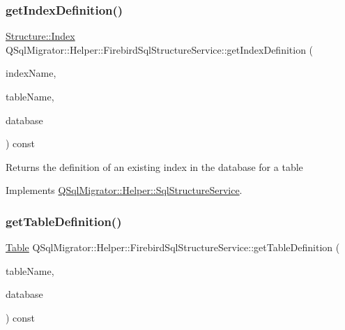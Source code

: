 \subsubsection{\texorpdfstring{get\+Index\+Definition()}{getIndexDefinition()}}
{\footnotesize\ttfamily \hyperlink{class_q_sql_migrator_1_1_structure_1_1_index}{Structure\+::\+Index} Q\+Sql\+Migrator\+::\+Helper\+::\+Firebird\+Sql\+Structure\+Service\+::get\+Index\+Definition (\begin{DoxyParamCaption}\item[{const Q\+String \&}]{index\+Name,  }\item[{const Q\+String \&}]{table\+Name,  }\item[{Q\+Sql\+Database}]{database }\end{DoxyParamCaption}) const\hspace{0.3cm}{\ttfamily [virtual]}}

\begin{DoxyReturn}{Returns}
the definition of an existing index in the database for a table 
\end{DoxyReturn}


Implements \hyperlink{class_q_sql_migrator_1_1_helper_1_1_sql_structure_service_ab62049f95710fc0965097f08b410e790}{Q\+Sql\+Migrator\+::\+Helper\+::\+Sql\+Structure\+Service}.

\mbox{\label{class_q_sql_migrator_1_1_helper_1_1_firebird_sql_structure_service_aface10de417ab9e0e749cfe2f53728e6}} 
\subsubsection{\texorpdfstring{get\+Table\+Definition()}{getTableDefinition()}}
{\footnotesize\ttfamily \hyperlink{class_q_sql_migrator_1_1_structure_1_1_table}{Table} Q\+Sql\+Migrator\+::\+Helper\+::\+Firebird\+Sql\+Structure\+Service\+::get\+Table\+Definition (\begin{DoxyParamCaption}\item[{const Q\+String \&}]{table\+Name,  }\item[{Q\+Sql\+Database}]{database }\end{DoxyParamCaption}) const\hspace{0.3cm}{\ttfamily [virtual]}}

